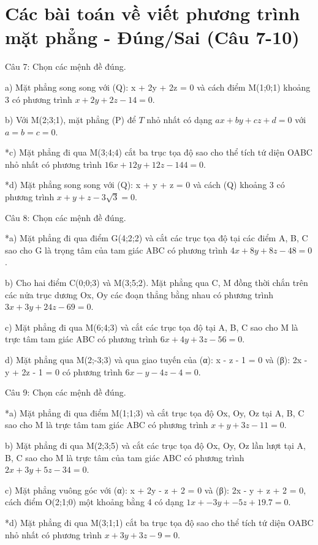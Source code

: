 \documentclass[a4paper,12pt]{article}
\begin{document}
\section*{Các bài toán về viết phương trình mặt phẳng - Đúng/Sai (Câu 7-10)}

Câu 7: Chọn các mệnh đề đúng.

a) Mặt phẳng song song với (Q): x + 2y + 2z = 0 và cách điểm M(1;0;1) khoảng 3 có phương trình \(x + 2y + 2z - 14 = 0\).

b) Với M(2;3;1), mặt phẳng (P) để \(T\) nhỏ nhất có dạng \(ax+by+cz+d=0\) với \(a=b=c=0\).

*c) Mặt phẳng đi qua M(3;4;4) cắt ba trục tọa độ sao cho thể tích tứ diện OABC nhỏ nhất có phương trình \(16x + 12y + 12z - 144 = 0\).

*d) Mặt phẳng song song với (Q): x + y + z = 0 và cách (Q) khoảng 3 có phương trình \(x + y + z - 3\sqrt{3} = 0\).



Câu 8: Chọn các mệnh đề đúng.

*a) Mặt phẳng đi qua điểm G(4;2;2) và cắt các trục tọa độ tại các điểm A, B, C sao cho G là trọng tâm của tam giác ABC có phương trình \(4x + 8y + 8z - 48 = 0\).

b) Cho hai điểm C(0;0;3) và M(3;5;2). Mặt phẳng qua C, M đồng thời chắn trên các nửa trục dương Ox, Oy các đoạn thẳng bằng nhau có phương trình \(3x + 3y + 24z - 69 = 0\).

c) Mặt phẳng đi qua M(6;4;3) và cắt các trục tọa độ tại A, B, C sao cho M là trực tâm tam giác ABC có phương trình \(6x + 4y + 3z - 56 = 0\).

d) Mặt phẳng qua M(2;-3;3) và qua giao tuyến của (α): x - z - 1 = 0 và (β): 2x - y + 2z - 1 = 0 có phương trình \(6x - y - 4z - 4 = 0\).



Câu 9: Chọn các mệnh đề đúng.

*a) Mặt phẳng đi qua điểm M(1;1;3) và cắt trục tọa độ Ox, Oy, Oz tại A, B, C sao cho M là trực tâm tam giác ABC có phương trình \(x + y + 3z - 11 = 0\).

b) Mặt phẳng đi qua M(2;3;5) và cắt các trục tọa độ Ox, Oy, Oz lần lượt tại A, B, C sao cho M là trực tâm của tam giác ABC có phương trình \(2x + 3y + 5z - 34 = 0\).

c) Mặt phẳng vuông góc với (α): x + 2y - z + 2 = 0 và (β): 2x - y + z + 2 = 0, cách điểm O(2;1;0) một khoảng bằng 4 có dạng \(1x + -3y + -5z + 19.7 = 0\).

*d) Mặt phẳng đi qua M(3;1;1) cắt ba trục tọa độ sao cho thể tích tứ diện OABC nhỏ nhất có phương trình \(x + 3y + 3z - 9 = 0\).
\end{document}
